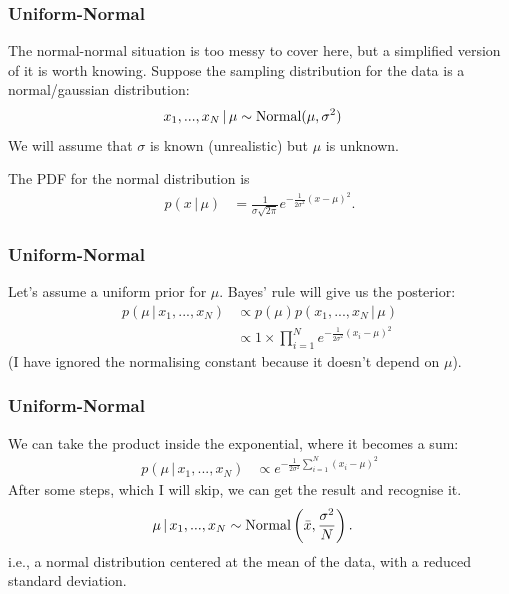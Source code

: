 \documentclass{beamer}
\newcommand{\given}{\,|\,}
\begin{document}
\begin{frame}
\frametitle{Uniform-Normal}
The normal-normal situation is too messy to cover here, but a simplified version
of it is worth knowing. Suppose the sampling distribution for the data is
a normal/gaussian distribution:
\begin{align}
x_1, ..., x_N \given \mu &\sim \textnormal{Normal}(\mu, \sigma^2)
\end{align}
\pause
We will assume that $\sigma$ is known (unrealistic) but $\mu$ is unknown.\pause

The PDF for the normal distribution is
\begin{align}
p(x \given \mu) &= \frac{1}{\sigma\sqrt{2\pi}}e^{-\frac{1}{2\sigma^2}(x-\mu)^2}.
\end{align}

\end{frame}


\begin{frame}
\frametitle{Uniform-Normal}
Let's assume a uniform prior for $\mu$.
Bayes' rule will give us the posterior:
\begin{align}
p(\mu \given x_1, ..., x_N) &\propto p(\mu)p(x_1, ..., x_N \given \mu) \\
    &\propto 1 \times \prod_{i=1}^N e^{-\frac{1}{2\sigma^2}(x_i - \mu)^2}
\end{align}
(I have ignored the normalising constant because it doesn't depend on $\mu$).

\end{frame}

\begin{frame}
\frametitle{Uniform-Normal}
We can take the product inside the exponential, where it becomes a sum:
\begin{align}
p(\mu \given x_1, ..., x_N) &\propto
    e^{-\frac{1}{2\sigma^2}\sum_{i=1}^N(x_i - \mu)^2}
\end{align}
\pause
After some steps, which I will skip, we can get the result and recognise it.
\begin{align}
\mu \given x_1, ..., x_N &\sim \textnormal{Normal}\left(\bar{x}, \frac{\sigma^2}{N}\right).
\end{align}
\pause
i.e., a normal distribution centered at the mean of the data, with a reduced
standard deviation.



\end{frame}
\end{document}
